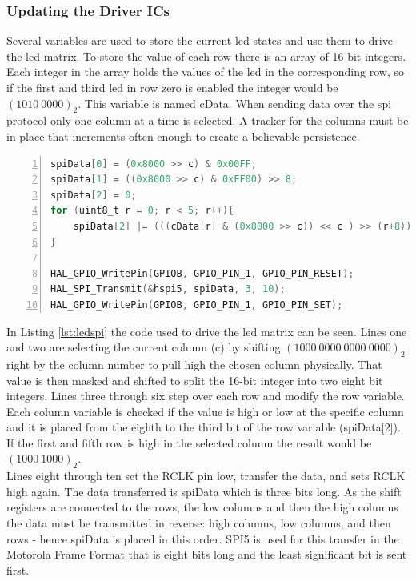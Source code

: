 \documentclass[12pt,a4paper]{report}
\begin{document}
\subsubsection{Updating the Driver ICs}
Several variables are used to store the current \ac{led} states and use them to drive the \ac{led} matrix. To store the value of each row there is an array of 16-bit integers. Each integer in the array holds the values of the led in the corresponding row, so if the first and third \ac{led} in row zero is enabled the integer would be $(1010\ 0000)_2$. This variable is named cData. When sending data over the \ac{spi} protocol only one column at a time is selected. A tracker for the columns must be in place that increments often enough to create a believable persistence.
\begin{lstlisting}[language=C, caption=Driving a row of LEDs, captionpos = b, numbers=left, frame=single,tabsize=3, label={lst:ledspi}]
spiData[0] = (0x8000 >> c) & 0x00FF;
spiData[1] = ((0x8000 >> c) & 0xFF00) >> 8;
spiData[2] = 0;
for (uint8_t r = 0; r < 5; r++){
	spiData[2] |= (((cData[r] & (0x8000 >> c)) << c ) >> (r+8));
}

HAL_GPIO_WritePin(GPIOB, GPIO_PIN_1, GPIO_PIN_RESET);
HAL_SPI_Transmit(&hspi5, spiData, 3, 10);
HAL_GPIO_WritePin(GPIOB, GPIO_PIN_1, GPIO_PIN_SET);
\end{lstlisting}
In Listing \ref{lst:ledspi} the code used to drive the \ac{led} matrix can be seen. Lines one and two are selecting the current column (c) by shifting $(1000\ 0000\ 0000\ 0000)_2$ right by the column number to pull high the chosen column physically. That value is then masked and shifted to split the 16-bit integer into two eight bit integers. Lines three through six step over each row and modify the row variable. Each column variable is checked if the value is high or low at the specific column and it is placed from the eighth to the third bit of the row variable (spiData[2]). If the first and fifth row is high in the selected column the result would be $(1000\ 1000)_2$.\\
Lines eight through ten set the RCLK pin low, transfer the data, and sets RCLK high again. The data transferred is spiData which is three bits long. As the shift registers are connected to the rows, the low columns and then the high columns the data must be transmitted in reverse: high columns, low columns, and then rows - hence spiData is placed in this order. SPI5 is used for this transfer in the Motorola Frame Format that is eight bits long and the least significant bit is sent first.
\end{document}

